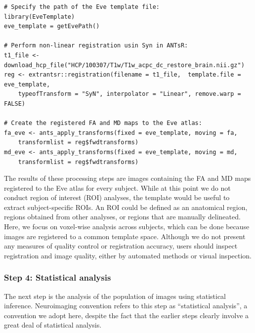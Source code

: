 \documentclass[]{elsarticle} %
\begin{document}
\color{blue}
\begin{verbatim}
# Specify the path of the Eve template file:
library(EveTemplate)
eve_template = getEvePath()

# Perform non-linear registration usin Syn in ANTsR:
t1_file <- download_hcp_file("HCP/100307/T1w/T1w_acpc_dc_restore_brain.nii.gz")
reg <- extrantsr::registration(filename = t1_file,  template.file = eve_template, 
    typeofTransform = "SyN", interpolator = "Linear", remove.warp = FALSE)

# Create the registered FA and MD maps to the Eve atlas:
fa_eve <- ants_apply_transforms(fixed = eve_template, moving = fa, 
    transformlist = reg$fwdtransforms)
md_eve <- ants_apply_transforms(fixed = eve_template, moving = md,
    transformlist = reg$fwdtransforms)    
\end{verbatim}
\color{black}

The results of these processing steps are images containing the FA and MD maps registered to the Eve atlas for every subject. While at this point we do not conduct region of interest (ROI) analyses, the template would be useful to extract subject-specific ROIs. An ROI could be defined as an anatomical region, regions obtained from other analyses, or regions that are manually delineated. Here, we focus on voxel-wise analysis across subjects, which can be done because images are registered to a common template space.  Although we do not present any measures of quality control or registration accuracy, users should inspect registration and image quality, either by automated methods or visual inspection.

\subsubsection{Step 4: Statistical analysis} 
The next step is the analysis of the population of images using statistical inference. Neuroimaging convention refers to this step as ``statistical analysis'', a convention we adopt here, despite the fact that the earlier steps clearly involve a great deal of statistical analysis.
\end{document}
